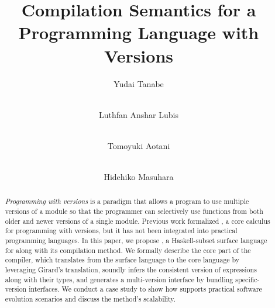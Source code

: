 \documentclass[runningheads]{llncs}
\begin{document}
%
\title{Compilation Semantics for a Programming Language with Versions}


\author{Yudai Tanabe \and\\
Luthfan Anshar Lubis \and\\
Tomoyuki Aotani \and\\
Hidehiko Masuhara
}


%
\maketitle            %
%  
\begin{abstract}
\emph{Programming with versions} is a paradigm that allows a program to use multiple versions of a module so that the programmer can selectively use functions from both older and newer versions of a single module.
Previous work formalized \corelang{}, a core calculus for programming with versions, but it has not been integrated into practical programming languages.
In this paper, we propose \mylang{}, a Haskell-subset surface language for \corelang{} along with its compilation method.
We formally describe the core part of the \mylang{} compiler, which translates from the surface language to the core language by leveraging Girard's translation, soundly infers the consistent version of expressions along with their types, and generates a multi-version interface by bundling specific-version interfaces. 
We conduct a case study to show how \mylang{} supports practical software evolution scenarios and discuss the method's scalability.
\end{abstract}
%
%
%

 
 
 
 
 
 
\end{document}
